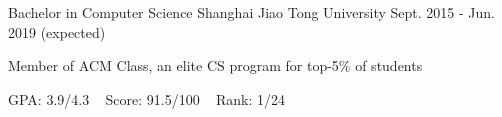 

\begin{cventries}

  \cventry
    {Bachelor in Computer Science} %
    {Shanghai Jiao Tong University} %
    {Sept. 2015 - Jun. 2019 (expected)} %
    {} %
    {
    \begin{cvitems} %
    	\item {Member of ACM Class, an elite CS program for top-5\% of students}
    	\item {GPA: 3.9/4.3 ~ Score: 91.5/100 ~ Rank: 1/24}
    \end{cvitems}
    }

\end{cventries}
